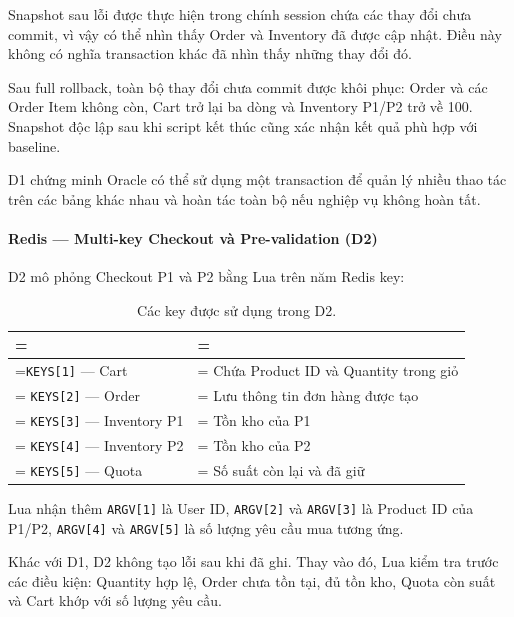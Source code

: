 Snapshot sau lỗi được thực hiện trong chính session chứa các thay đổi chưa commit, vì vậy có thể nhìn thấy Order và Inventory đã được cập nhật. Điều này không có nghĩa transaction khác đã nhìn thấy những thay đổi đó.

Sau full rollback, toàn bộ thay đổi chưa commit được khôi phục: Order và các Order Item không còn, Cart trở lại ba dòng và Inventory P1/P2 trở về 100. Snapshot độc lập sau khi script kết thúc cũng xác nhận kết quả phù hợp với baseline.

D1 chứng minh Oracle có thể sử dụng một transaction để quản lý nhiều thao tác trên các bảng khác nhau và hoàn tác toàn bộ nếu nghiệp vụ không hoàn tất.

\paragraph*{Redis — Multi-key Checkout và Pre-validation (D2)}

D2 mô phỏng Checkout P1 và P2 bằng Lua trên năm Redis key:

\begin{table}[!htbp]
\centering
\caption{Các key được sử dụng trong D2.}\label{tab:tx-14}
\reporttablesetup
\begin{tabularx}{\linewidth}{|>{\hsize\linewidth=\hsize}L|>{\hsize\linewidth=\hsize}L|}
\hline
{}
 &  \\ \hline
\texttt{KEYS[1]} — Cart & Chứa Product ID và Quantity trong giỏ \\ \hline
\texttt{KEYS[2]} — Order & Lưu thông tin đơn hàng được tạo \\ \hline
\texttt{KEYS[3]} — Inventory P1 & Tồn kho của P1 \\ \hline
\texttt{KEYS[4]} — Inventory P2 & Tồn kho của P2 \\ \hline
\texttt{KEYS[5]} — Quota & Số suất còn lại và đã giữ \\ \hline
\end{tabularx}
\end{table}
Lua nhận thêm \texttt{ARGV[1]} là User ID, \texttt{ARGV[2]} và \texttt{ARGV[3]} là Product ID của P1/P2, \texttt{ARGV[4]} và \texttt{ARGV[5]} là số lượng yêu cầu mua tương ứng.

Khác với D1, D2 không tạo lỗi sau khi đã ghi. Thay vào đó, Lua kiểm tra trước các điều kiện: Quantity hợp lệ, Order chưa tồn tại, đủ tồn kho, Quota còn suất và Cart khớp với số lượng yêu cầu.

